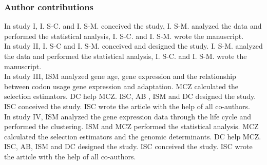  \vspace{2cm}

\renewcommand{\baselinestretch}{0.8}\small
\subsubsection{Author contributions}
%
In study I, I. S-C. and I. S-M. conceived the study, I. S-M. analyzed the data and performed the statistical analysis, I. S-C. and I. S-M. wrote the manuscript. 
\\
In study II, I. S-C and I. S-M. conceived and designed the study. I. S-M. analyzed the data and performed the statistical analysis, I. S-C. and I. S-M. wrote the manuscript. 
\\
In study III, ISM analyzed gene age, gene expression and the relationship between codon usage gene expression and adaptation. MCZ calculated the selection estimators. DC help MCZ. ISC, AB , ISM and DC designed the study. ISC conceived the study. ISC wrote the article with the help of all co-authors.
\\
In study IV, ISM analyzed the gene expression data through the life cycle and performed the clustering. ISM and MCZ performed the statistical analysis. MCZ calculated the selection estimators and the genomic determinants. DC help MCZ. ISC, AB, ISM and DC designed the study. ISC conceived the study. ISC wrote the article with the help of all co-authors. 

\renewcommand{\baselinestretch}{1.0}\normalsize
